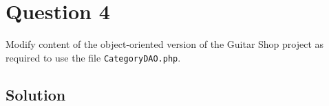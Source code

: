 
\section*{Question 4}

Modify content of the object-oriented version of the Guitar Shop project as required to use the file \texttt{CategoryDAO.php}.

\subsection*{Solution}

